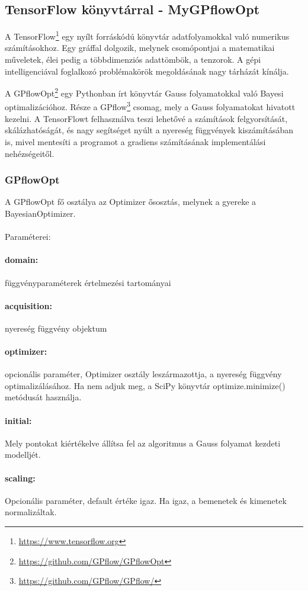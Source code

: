 \subsection{TensorFlow könyvtárral - MyGPflowOpt}
A TensorFlow\footnote{\url{https://www.tensorflow.org}} egy nyílt forráskódú könyvtár adatfolyamokkal való numerikus számításokhoz. Egy gráffal dolgozik, melynek csomópontjai a matematikai műveletek, élei pedig a többdimenziós adattömbök, a tenzorok. A gépi intelligenciával foglalkozó problémakörök megoldásának nagy tárházát kínálja.

A GPflowOpt\footnote{\url{https://github.com/GPflow/GPflowOpt}} egy Pythonban írt könyvtár Gauss folyamatokkal való Bayesi optimalizációhoz. Része a GPflow\footnote{\url{https://github.com/GPflow/GPflow/}} csomag, mely a Gauss folyamatokat hivatott kezelni. A TensorFlowt felhasználva teszi lehetővé a számítások felgyorsítását, skálázhatóságát, és nagy segítséget nyúlt a nyereség függvények kiszámításában is, mivel mentesíti a programot a gradiens számításának implementálási nehézségeitől.

\subsubsection{GPflowOpt}

A GPflowOpt fő osztálya az Optimizer ősosztás, melynek a gyereke a BayesianOptimizer.\\\\
Paraméterei:
\paragraph{domain:} függvényparaméterek értelmezési tartományai
\paragraph{acquisition:} nyereség függvény objektum
\paragraph{optimizer:} opcionális paraméter, Optimizer osztály leszármazottja, a nyereség függvény optimalizálásához. Ha nem adjuk meg, a SciPy könyvtár optimize.minimize() metódusát használja.
\paragraph{initial:} Mely pontokat kiértékelve állítsa fel az algoritmus a Gauss folyamat kezdeti modelljét.
\paragraph{scaling:} Opcionális paraméter, default értéke igaz. Ha igaz, a bemenetek és kimenetek normalizáltak.
